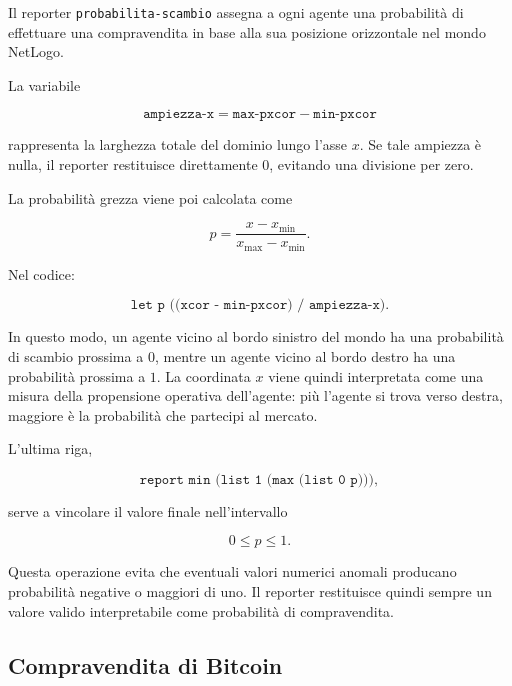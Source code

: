 Il reporter \texttt{probabilita-scambio} assegna a ogni agente una probabilità
di effettuare una compravendita in base alla sua posizione orizzontale nel mondo
NetLogo.

La variabile

\[
\texttt{ampiezza-x}
=
\texttt{max-pxcor} - \texttt{min-pxcor}
\]

rappresenta la larghezza totale del dominio lungo l'asse \(x\). Se tale ampiezza
è nulla, il reporter restituisce direttamente \(0\), evitando una divisione per
zero.

La probabilità grezza viene poi calcolata come

\[
p =
\frac{x - x_{\min}}{x_{\max} - x_{\min}}.
\]

Nel codice:

\[
\texttt{let p ((xcor - min-pxcor) / ampiezza-x)}.
\]

In questo modo, un agente vicino al bordo sinistro del mondo ha una probabilità
di scambio prossima a \(0\), mentre un agente vicino al bordo destro ha una
probabilità prossima a \(1\). La coordinata \(x\) viene quindi interpretata come
una misura della propensione operativa dell'agente: più l'agente si trova verso
destra, maggiore è la probabilità che partecipi al mercato.

L'ultima riga,

\[
\texttt{report min (list 1 (max (list 0 p)))},
\]

serve a vincolare il valore finale nell'intervallo

\[
0 \leq p \leq 1.
\]

Questa operazione evita che eventuali valori numerici anomali producano
probabilità negative o maggiori di uno. Il reporter restituisce quindi sempre
un valore valido interpretabile come probabilità di compravendita.

\subsection{Compravendita di Bitcoin}

